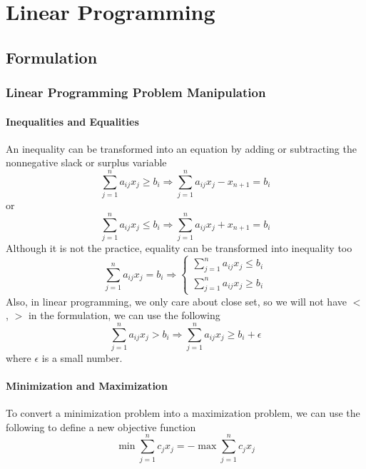 \part{Linear Programming}
	\chapter{Formulation}
		\section{Linear Programming Problem Manipulation}
			\subsection{Inequalities and Equalities}
				An inequality can be transformed into an equation by adding or subtracting the nonnegative slack or surplus variable
				\begin{equation}
					\sum_{j=1}^na_{ij}x_j \ge b_i \Rightarrow \sum_{j=1}^na_{ij}x_j - x_{n+1} = b_i 
				\end{equation}
				or
				\begin{equation}
					\sum_{j=1}^na_{ij}x_j \le b_i \Rightarrow \sum_{j=1}^na_{ij}x_j + x_{n+1} = b_i 
				\end{equation}
				Although it is not the practice, equality can be transformed into inequality too
				\begin{equation}
					\sum_{j=1}^na_{ij}x_j = b_i \Rightarrow \begin{cases}\sum_{j=1}^na_{ij}x_j \le b_i \\ \sum_{j=1}^na_{ij}x_j \ge b_i \end{cases} 
				\end{equation}
				Also, in linear programming, we only care about close set, so we will not have $<$, $>$ in the formulation, we can use the following
				\begin{equation}
					\sum_{j=1}^na_{ij}x_j > b_i \Rightarrow \sum_{j=1}^na_{ij}x_j \ge b_i + \epsilon 
				\end{equation}
				where $\epsilon$ is a small number.
			
			\subsection{Minimization and Maximization}
				To convert a minimization problem into a maximization problem, we can use the following to define a new objective function
				\begin{equation}
					\min \sum_{j=1}^nc_jx_j = -\max \sum_{j=1}^n c_jx_j 
				\end{equation}
			
